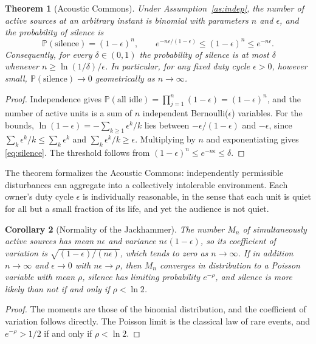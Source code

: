 \documentclass[11pt]{article}
\newtheorem{theorem}{Theorem}[section]
\newtheorem{corollary}[theorem]{Corollary}
\theoremstyle{definition}
\theoremstyle{remark}
\newcommand{\Prob}{\mathbb{P}}
\begin{document}
\begin{theorem}[Acoustic Commons]\label{thm:commons}
Under Assumption~\ref{as:indep}, the number of active sources at an arbitrary instant is binomial with parameters $n$ and $\epsilon$, and the probability of silence is
\begin{equation}\label{eq:silence}
\Prob(\text{silence}) = (1-\epsilon)^n, \qquad e^{-n\epsilon/(1-\epsilon)} \le (1-\epsilon)^n \le e^{-n\epsilon}.
\end{equation}
Consequently, for every $\delta\in(0,1)$ the probability of silence is at most $\delta$ whenever $n \ge \ln(1/\delta)/\epsilon$. In particular, for any fixed duty cycle $\epsilon>0$, however small, $\Prob(\text{silence})\to0$ geometrically as $n\to\infty$.
\end{theorem}

\begin{proof}
Independence gives $\Prob(\text{all idle}) = \prod_{j=1}^n(1-\epsilon) = (1-\epsilon)^n$, and the number of active units is a sum of $n$ independent Bernoulli($\epsilon$) variables. For the bounds, $\ln(1-\epsilon) = -\sum_{k\ge1}\epsilon^k/k$ lies between $-\epsilon/(1-\epsilon)$ and $-\epsilon$, since $\sum_k \epsilon^k/k \le \sum_k\epsilon^k$ and $\sum_k\epsilon^k/k\ge\epsilon$. Multiplying by $n$ and exponentiating gives \eqref{eq:silence}. The threshold follows from $(1-\epsilon)^n\le e^{-n\epsilon}\le\delta$.
\end{proof}

The theorem formalizes the Acoustic Commons: independently permissible disturbances can aggregate into a collectively intolerable environment. Each owner's duty cycle $\epsilon$ is individually reasonable, in the sense that each unit is quiet for all but a small fraction of its life, and yet the audience is not quiet.

\begin{corollary}[Normality of the Jackhammer]\label{cor:normal}
The number $M_n$ of simultaneously active sources has mean $n\epsilon$ and variance $n\epsilon(1-\epsilon)$, so its coefficient of variation is $\sqrt{(1-\epsilon)/(n\epsilon)}$, which tends to zero as $n\to\infty$. If in addition $n\to\infty$ and $\epsilon\to0$ with $n\epsilon\to\rho$, then $M_n$ converges in distribution to a Poisson variable with mean $\rho$, silence has limiting probability $e^{-\rho}$, and silence is more likely than not if and only if $\rho<\ln 2$.
\end{corollary}

\begin{proof}
The moments are those of the binomial distribution, and the coefficient of variation follows directly. The Poisson limit is the classical law of rare events, and $e^{-\rho}>1/2$ if and only if $\rho<\ln2$.
\end{proof}
\end{document}
